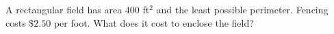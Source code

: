 A rectangular field has area $400$ ft$^2$ and the least possible perimeter. Fencing costs $\$2.50$ per foot. What does it cost to enclose the field?
